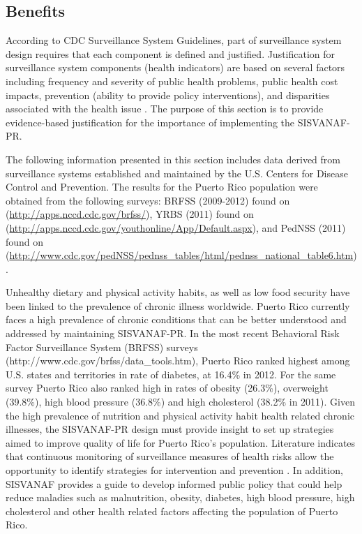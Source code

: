 \documentclass[12pt,letterpaper]{report}
\begin{document}
\subsection{Benefits}

According to CDC Surveillance System Guidelines, part of surveillance system design requires that each component is defined and justified\cite{german2001updated}. Justification for surveillance system components (health indicators) are based on several factors including frequency and severity of public health problems, public health cost impacts, prevention (ability to provide policy interventions), and disparities associated with the health issue \cite{german2001updated}. The purpose of this section is to provide evidence-based justification for the importance of implementing the SISVANAF-PR.

The following information presented in this section includes data derived from surveillance systems established and maintained by the U.S. Centers for Disease Control and Prevention. The results for the Puerto Rico population were obtained from the following surveys: BRFSS (2009-2012) found on (\url{http://apps.nccd.cdc.gov/brfss/}), YRBS (2011) found on (\url{http://apps.nccd.cdc.gov/youthonline/App/Default.aspx}), and PedNSS (2011) found on (\url{http://www.cdc.gov/pedNSS/pednss_tables/html/pednss_national_table6.htm}).

Unhealthy dietary and physical activity habits, as well as low food security have been linked to the prevalence of chronic illness worldwide. Puerto Rico currently faces a high prevalence of chronic conditions that can be better understood and addressed by maintaining SISVANAF-PR. In the most recent Behavioral Risk Factor Surveillance System (BRFSS) surveys
 (http://www.cdc.gov/brfss/data\_tools.htm), Puerto Rico ranked highest among U.S. states and territories in rate of diabetes, at 16.4\% in 2012. For the same survey Puerto Rico also ranked high in rates of obesity (26.3\%), overweight (39.8\%), high blood pressure (36.8\%) and high cholesterol (38.2\% in 2011). Given the high prevalence of nutrition and physical activity habit health related chronic illnesses, the SISVANAF-PR design must provide insight to set up strategies aimed to improve quality of life for Puerto Rico's population. Literature indicates that continuous monitoring of surveillance measures of health risks allow the opportunity to identify strategies for intervention and prevention \cite{german2001updated}. In addition, SISVANAF provides a guide to develop informed public policy that could help reduce maladies such as malnutrition, obesity, diabetes, high blood pressure, high cholesterol and other health related factors affecting the population of Puerto Rico.
\end{document}
